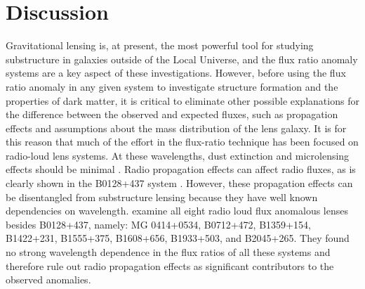 \documentclass[useAMS,usenatbib]{mn2e}
\begin{document}
\section{Discussion}

Gravitational lensing is, at present, the most powerful tool for
studying substructure in galaxies outside of the Local Universe, and
the flux ratio anomaly systems are a key aspect of these
investigations.  However, before using the flux ratio anomaly in any
given system to investigate structure formation and the properties of
dark matter, it is critical to eliminate other possible explanations
for the difference between the observed and expected fluxes, such as
propagation effects and assumptions about the mass distribution of the
lens galaxy.  It is for this reason that much of the effort in the
flux-ratio technique has been focused on radio-loud lens systems.  At
these wavelengths, dust extinction and microlensing effects should be
minimal \citep[although see][for a rare example of radio
  microlensing]{K2000}.  Radio propagation effects can affect radio
fluxes, as is clearly shown in the B0128+437 system \citep{B04}.
However, these propagation effects can be disentangled from
substructure lensing because they have well known dependencies on
wavelength. \citet{KD04} examine all eight radio loud flux anomalous
lenses besides B0128+437, namely: MG 0414+0534, B0712+472, B1359+154,
B1422+231, B1555+375, B1608+656, B1933+503, and B2045+265.  They found
no strong wavelength dependence in the flux ratios of all these
systems and therefore rule out radio propagation effects as
significant contributors to the observed anomalies.
\end{document}
